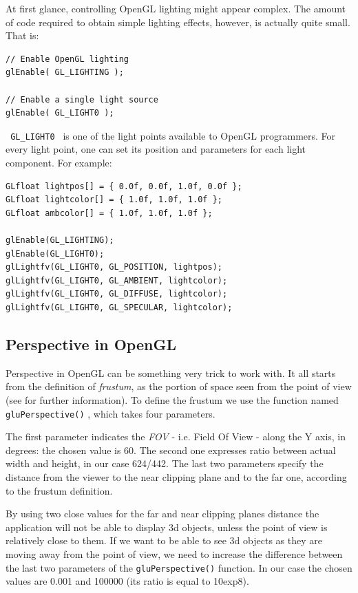 %
At first glance, controlling OpenGL lighting might appear complex. 
The amount of code required to obtain simple lighting effects, 
however, is actually quite small. That is:
\begin{lstlisting}[caption={Lighting example}, label={code:lighting}, frame=trBL]
// Enable OpenGL lighting
glEnable( GL_LIGHTING );

// Enable a single light source
glEnable( GL_LIGHT0 );
\end{lstlisting}
%
\texttt{ GL\_LIGHT0 } is one of the light points available to 
OpenGL programmers. For every light point, one can set its 
position and parameters for each light component. For example:
%
\begin{lstlisting}[caption={Complex lighting example}, label={code:complexlighting}, frame=trBL]
GLfloat lightpos[] = { 0.0f, 0.0f, 1.0f, 0.0f };
GLfloat lightcolor[] = { 1.0f, 1.0f, 1.0f };
GLfloat ambcolor[] = { 1.0f, 1.0f, 1.0f };

glEnable(GL_LIGHTING);
glEnable(GL_LIGHT0);                        
glLightfv(GL_LIGHT0, GL_POSITION, lightpos);
glLightfv(GL_LIGHT0, GL_AMBIENT, lightcolor);
glLightfv(GL_LIGHT0, GL_DIFFUSE, lightcolor);
glLightfv(GL_LIGHT0, GL_SPECULAR, lightcolor);
\end{lstlisting}
%
\subsection{Perspective in OpenGL}
Perspective in OpenGL can be something very trick to work with. 
It all starts from the definition of \textit{frustum}, as the portion
of space seen from the point of view (see \cite{wiki:frustum} 
for further information). To define the frustum we use the function
named \texttt{gluPerspective()} \cite{opengl:gluPerspective}, which takes 
four parameters.
%

%
The first parameter indicates the \textit{FOV} - i.e. Field Of View -
along the Y axis, in degrees: the chosen value is 60. The
second one expresses ratio between actual width and height, 
in our case 624/442. The last two parameters specify the distance 
from the viewer to the near clipping plane and to the far one, 
according to the frustum definition.
%

%
By using two close values for the far and near clipping planes 
distance the application will not be able to display 3d
objects, unless the point of view is relatively close to them. 
If we want to be able to see 3d objects as they are moving away
from the point of view, we need to increase the difference between 
the last two parameters of the \texttt{gluPerspective()} function. In
our case the chosen values are 0.001 and 100000 (its ratio is 
equal to 10exp8).
%

